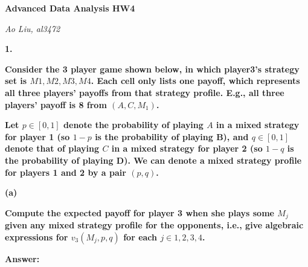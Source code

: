 \documentclass[letterpaper,11pt]{article}
\begin{document}
\begin{center}
	\textbf{\Huge{Advanced Data Analysis HW4}}
\end{center}

\begin{center}
	\textsl{Ao Liu, al3472}
\end{center}

\bigbreak
\bigbreak
\bigbreak




\begin{addmargin}[-2em]{0em} \large{\textbf{1. }}\end{addmargin}
\textbf{Consider the 3 player game shown below, in which player3’s strategy set is ${M1,M2,M3,M4}$. Each cell only lists one payoff, which represents all three players’ payoffs from that strategy profile. E.g., all three players’ payoff is 8 from $(A, C, M_1)$.}
\bigbreak

\textbf{Let $p \in [0, 1]$ denote the probability of playing $A$ in a mixed strategy for player 1 (so $1 - p$ is the probability of playing B), and $q \in [0, 1]$ denote that of playing $C$ in a mixed strategy for player 2 (so $1 - q$ is the probability of playing D). We can denote a mixed strategy profile for players 1 and 2 by a pair $(p, q)$.}

\begin{addmargin}[-1.1em]{0em} \textbf{(a)}\par\end{addmargin}
  \textbf{Compute the expected payoff for player 3 when she plays some $M_j$ given any mixed strategy profile for the opponents, i.e., give algebraic expressions for $v_3(M_j,p,q)$ for each $j \in {1,2,3,4}$.}\par
\bigbreak
\begin{addmargin}[-0.5em]{0em}
\textbf{Answer: }\end{addmargin}
\end{document}
